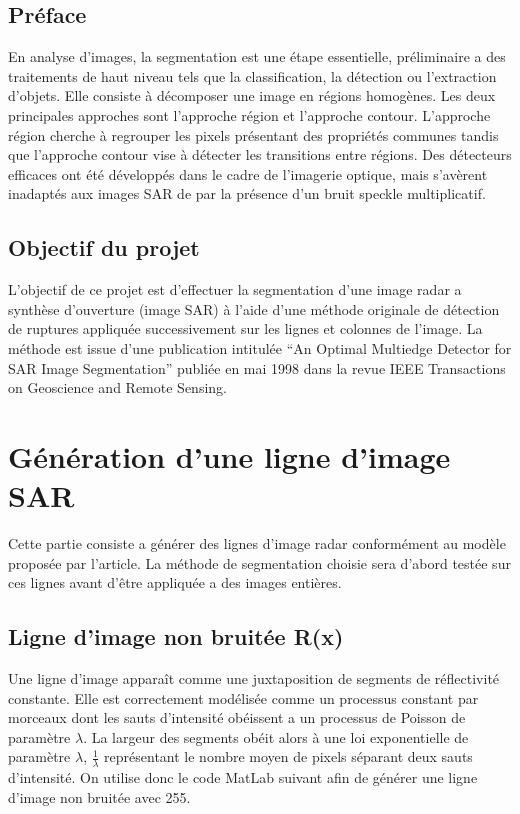 \documentclass[a4paper,11pt]{article}
\begin{document}
\subsection{Préface}

En analyse d'images, la segmentation est une étape essentielle, préliminaire a des traitements de haut niveau tels que la classification, la détection ou l'extraction d'objets. Elle consiste à décomposer une image en régions homogènes. Les deux principales approches sont l'approche région et l'approche contour. L'approche région cherche à regrouper les pixels présentant des propriétés communes tandis que l'approche contour vise à détecter les transitions entre régions. Des détecteurs efficaces ont été développés dans le cadre de l'imagerie optique, mais s'avèrent inadaptés aux images SAR de par la présence d'un bruit speckle multiplicatif.

\subsection{Objectif du projet}

L'objectif de ce projet est d'effectuer la segmentation d'une image radar a synthèse
d'ouverture (image SAR) à l'aide d'une méthode originale de détection de
ruptures appliquée successivement sur les lignes et colonnes de l'image. La méthode
est issue d'une publication intitulée “An Optimal Multiedge Detector for SAR Image
Segmentation” publiée en mai 1998 dans la revue IEEE Transactions on Geoscience
and Remote Sensing.

\newpage

\section{Génération d'une ligne d'image SAR}

Cette partie consiste a générer des lignes d'image radar conformément au
modèle proposée par l'article. La méthode de segmentation choisie sera
d'abord testée sur ces lignes avant d'être appliquée a des images entières.

\subsection{Ligne d'image non bruitée R(x)}

Une ligne d'image apparaît comme une juxtaposition de segments de réflectivité constante.
Elle est correctement modélisée comme un processus constant par morceaux dont les
sauts d'intensité obéissent a un processus de Poisson de paramètre $\lambda$. La
largeur des segments obéit alors à une loi exponentielle de paramètre $\lambda$, $\frac{1}{\lambda}$ représentant
le nombre moyen de pixels séparant deux sauts d'intensité. On utilise donc le code MatLab suivant afin de générer une ligne d'image non bruitée avec 255.
\end{document}
